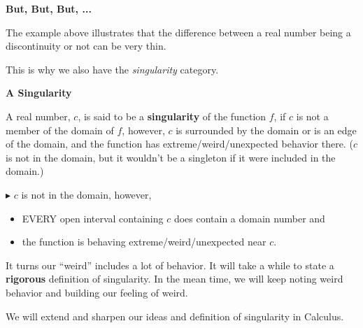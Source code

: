 \documentclass{ximera}
\begin{document}
\begin{observation} \textbf{\textcolor{-red!75}{But, But, But, ...}}  

The example above illustrates that the difference between a real number being a discontinuity or not can be very thin.

This is why we also have the \textit{singularity} category.

\end{observation}










\begin{idea} \textbf{\textcolor{blue!55!black}{A Singularity}}  

A real number, $c$, is said to be a \textbf{singularity} of the function $f$, if $c$ is not a member of the domain of $f$, however, $c$ is surrounded by the domain or is an edge of the domain, and the function has extreme/weird/unexpected behavior there. ($c$ is not in the domain, but it wouldn't be a singleton if it were included in the domain.) 



$\blacktriangleright$  $c$ is not in the domain, however, 


\begin{itemize}
\item EVERY open interval containing $c$ does contain a domain number and 
\item the function is behaving extreme/weird/unexpected near $c$. 
\end{itemize}
It turns our ``weird'' includes a lot of behavior.  It will take a while to state a \textbf{\textcolor{purple!85!blue}{rigorous}} definition of singularity.  In the mean time, we will keep noting weird behavior and building our feeling of weird.


We will extend and sharpen our ideas and definition of singularity in Calculus.



\end{idea}
\end{document}
